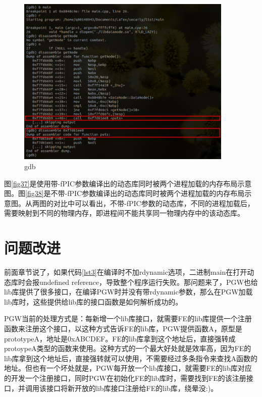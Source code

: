 \documentclass[a4paper, 12pt, titlepage]{article}
\begin{document}
\begin{figure}[!htb]
  \setlength{\abovecaptionskip}{0pt}
  \centering
  \includegraphics[width=0.92\textwidth]{gdb.png}
  \caption{gdb}
  \label{fig36}
\end{figure}

图\ref{fig37}是使用带-fPIC参数编译出的动态库同时被两个进程加载的内存布局示意图。图\ref{fig38}是不带-fPIC参数编译出的动态库同时被两个进程加载的内存布局示意图。从两图的对比中可以看出，不带-fPIC参数的动态库，不同的进程加载后，需要映射到不同的物理内存，即进程间不能共享同一物理内存中的该动态库。



\section{问题改进}
前面章节说了，如果代码\ref{lst3}在编译时不加rdynamic选项，二进制main在打开动态库时会报undefined reference，导致整个程序运行失败。那问题来了，PGW也给lib库提供了很多接口，在编译PGW时并没有带rdynamic参数，那么在PGW加载lib库时，这些提供给lib库的接口函数是如何解析成功的。

PGW当前的处理方式是：每新增一个lib库接口，就需要FE的lib库提供一个注册函数来注册这个接口，以这种方式告诉FE的lib库，PGW提供函数A，原型是prototypeA，地址是0xABCDEF。FE的lib库拿到这个地址后，直接强转成protoypeA类型的函数来使用。这种方式的一个最大好处就是效率高，因为FE的lib库拿到这个地址后，直接强转就可以使用，不需要经过多条指令来查找A函数的地址。但也有一个坏处就是，PGW每开放一个lib库接口，就需要FE的lib库对应的开发一个注册接口，同时PGW在初始化FE的lib库时，需要找到FE的该注册接口，并调用该接口将新开放的lib库接口注册给FE的lib库，绕晕没:)。
\end{document}

